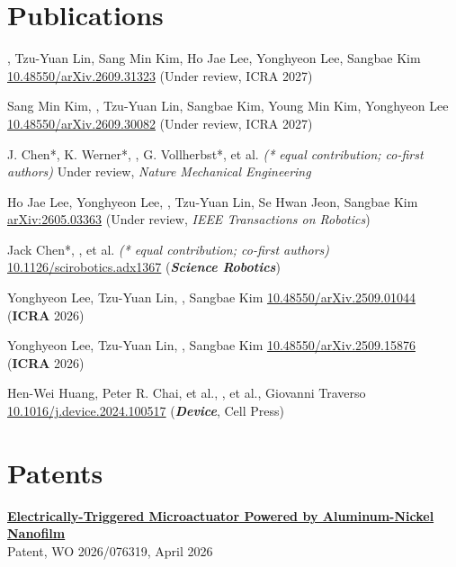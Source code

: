 \section{Publications}
  {\myname, Tzu-Yuan Lin, Sang Min Kim, Ho Jae Lee, Yonghyeon Lee, Sangbae Kim}
  {\href{https://doi.org/10.48550/arXiv.2609.31323}{10.48550/arXiv.2609.31323} (Under review, ICRA 2027)}

  {Sang Min Kim, \myname, Tzu-Yuan Lin, Sangbae Kim, Young Min Kim, Yonghyeon Lee}
  {\href{https://doi.org/10.48550/arXiv.2609.30082}{10.48550/arXiv.2609.30082} (Under review, ICRA 2027)}

  {J. Chen*, K. Werner*, \myname*, G. Vollherbst*, et al. \textit{(* equal contribution; co-first authors)}}
  {Under review, \textit{Nature Mechanical Engineering}}

  {Ho Jae Lee, Yonghyeon Lee, \myname, Tzu-Yuan Lin, Se Hwan Jeon, Sangbae Kim}
  {\href{https://arxiv.org/abs/2605.03363}{arXiv:2605.03363} (Under review, \textit{IEEE Transactions on Robotics})}

  {Jack Chen*, \myname*, et al. \textit{(* equal contribution; co-first authors)}}
  {\href{https://doi.org/10.1126/scirobotics.adx1367}{10.1126/scirobotics.adx1367} (\textbf{\textit{Science Robotics}})}

  {Yonghyeon Lee, Tzu-Yuan Lin, \myname, Sangbae Kim}
  {\href{https://doi.org/10.48550/arXiv.2509.01044}{10.48550/arXiv.2509.01044} (\textbf{ICRA} 2026)}

  {Yonghyeon Lee, Tzu-Yuan Lin, \myname, Sangbae Kim}
  {\href{https://doi.org/10.48550/arXiv.2509.15876}{10.48550/arXiv.2509.15876} (\textbf{ICRA} 2026)}

  {Hen-Wei Huang, Peter R. Chai, et al., \myname, et al., Giovanni Traverso}
  {\href{https://doi.org/10.1016/j.device.2024.100517}{10.1016/j.device.2024.100517} (\textbf{\textit{Device}}, Cell Press)}

\section{Patents}
\textbf{\href{https://patentscope.wipo.int/search/en/WO2026076319}{Electrically-Triggered Microactuator Powered by Aluminum-Nickel Nanofilm}}\\[-1pt]
{\small Patent, WO 2026/076319, April 2026}
